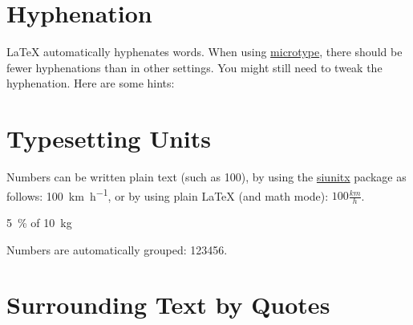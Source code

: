 \begin{ltgexample}
\end{ltgexample}

\section{Hyphenation}

\LaTeX{} automatically hyphenates words.
When using \href{https://ctan.org/pkg/microtype}{microtype}, there should be fewer hyphenations than in other settings.
You might still need to tweak the hyphenation.
Here are some hints:


\section{Typesetting Units}

\begin{ltgexample}
Numbers can be written plain text (such as 100), by using the \href{https://ctan.org/pkg/siunitx}{siunitx} package as follows:
\SI{100}{\km\per\hour},
or by using plain \LaTeX{} (and math mode):
$100 \frac{\mathit{km}}{h}$.
\end{ltgexample}

\begin{ltgexample}
\SI{5}{\percent} of \SI{10}{kg}
\end{ltgexample}

\begin{ltgexample}
Numbers are automatically grouped: \num{123456}.
\end{ltgexample}

\section{Surrounding Text by Quotes}

